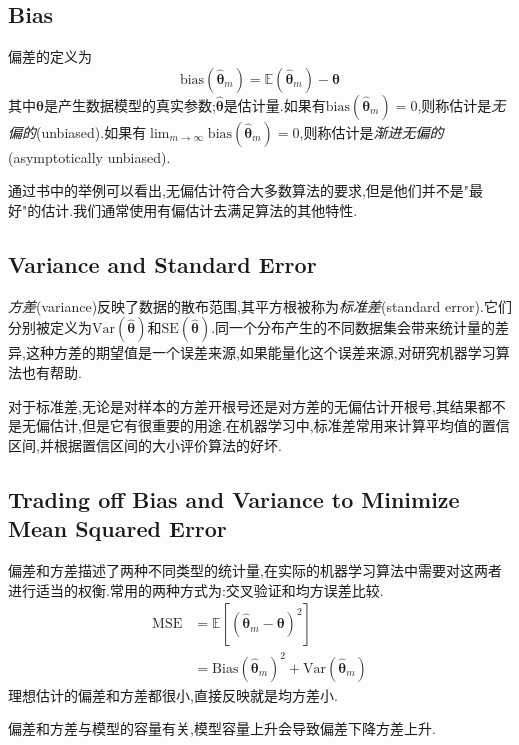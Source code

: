 \subsection{Bias}

偏差的定义为
\begin{equation}
\text{bias}(\hat{\bm\theta}_m)=\mathbb E(\hat{\bm\theta}_m)-{\bm\theta}
\end{equation}
其中${\bm\theta}$是产生数据模型的真实参数;$\hat{\bm\theta}$是估计量.如果有$\text{bias}(\hat{\bm\theta}_m)=0$,则称估计是\textit{无偏的}(unbiased).如果有$\lim_{m\to\infty}\text{bias}(\hat{\bm\theta}_m)=0$,则称估计是\textit{渐进无偏的}(asymptotically unbiased).

通过书中的举例可以看出,无偏估计符合大多数算法的要求,但是他们并不是"最好"的估计.我们通常使用有偏估计去满足算法的其他特性.

\subsection{Variance and Standard Error}

\textit{方差}(variance)反映了数据的散布范围,其平方根被称为\textit{标准差}(standard error).它们分别被定义为$\text{Var}(\hat{\bm\theta})$和$\text{SE}(\hat{\bm\theta})$.同一个分布产生的不同数据集会带来统计量的差异,这种方差的期望值是一个误差来源,如果能量化这个误差来源,对研究机器学习算法也有帮助.

对于标准差,无论是对样本的方差开根号还是对方差的无偏估计开根号,其结果都不是无偏估计,但是它有很重要的用途.在机器学习中,标准差常用来计算平均值的置信区间,并根据置信区间的大小评价算法的好坏.

\subsection{Trading off Bias and Variance to Minimize Mean Squared Error}

偏差和方差描述了两种不同类型的统计量,在实际的机器学习算法中需要对这两者进行适当的权衡.常用的两种方式为:交叉验证和均方误差比较.
\begin{equation}\begin{split}
\text{MSE}&=\mathbb E[(\hat{\bm\theta}_m-{\bm\theta})^2]\\
&=\text{Bias}(\hat{\bm\theta}_m)^2+\text{Var}(\hat{\bm\theta}_m)
\end{split}\end{equation}
理想估计的偏差和方差都很小,直接反映就是均方差小.

偏差和方差与模型的容量有关,模型容量上升会导致偏差下降方差上升.

